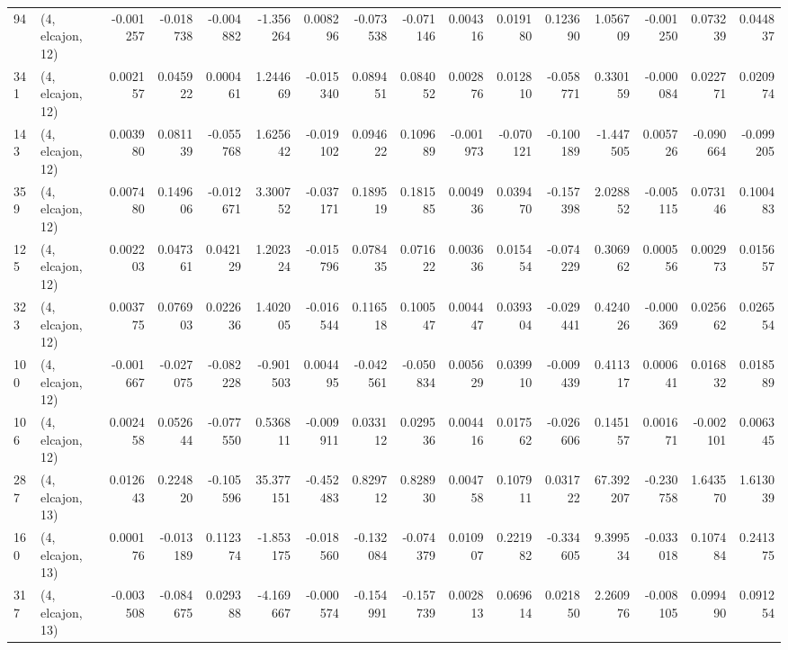 \begin{tabular}{llrrrrrrrrrrrrrr}
94  &  (4, elcajon, 12) &  -0.001257 & -0.018738 & -0.004882 &   -1.356264 &  0.008296 &  -0.073538 & -0.071146 &  0.004316 &  0.019180 &  0.123690 &    1.056709 & -0.001250 &  0.073239 &  0.044837 \\
341 &  (4, elcajon, 12) &   0.002157 &  0.045922 &  0.000461 &    1.244669 & -0.015340 &   0.089451 &  0.084052 &  0.002876 &  0.012810 & -0.058771 &    0.330159 & -0.000084 &  0.022771 &  0.020974 \\
143 &  (4, elcajon, 12) &   0.003980 &  0.081139 & -0.055768 &    1.625642 & -0.019102 &   0.094622 &  0.109689 & -0.001973 & -0.070121 & -0.100189 &   -1.447505 &  0.005726 & -0.090664 & -0.099205 \\
359 &  (4, elcajon, 12) &   0.007480 &  0.149606 & -0.012671 &    3.300752 & -0.037171 &   0.189519 &  0.181585 &  0.004936 &  0.039470 & -0.157398 &    2.028852 & -0.005115 &  0.073146 &  0.100483 \\
125 &  (4, elcajon, 12) &   0.002203 &  0.047361 &  0.042129 &    1.202324 & -0.015796 &   0.078435 &  0.071622 &  0.003636 &  0.015454 & -0.074229 &    0.306962 &  0.000556 &  0.002973 &  0.015657 \\
323 &  (4, elcajon, 12) &   0.003775 &  0.076903 &  0.022636 &    1.402005 & -0.016544 &   0.116518 &  0.100547 &  0.004447 &  0.039304 & -0.029441 &    0.424026 & -0.000369 &  0.025662 &  0.026554 \\
100 &  (4, elcajon, 12) &  -0.001667 & -0.027075 & -0.082228 &   -0.901503 &  0.004495 &  -0.042561 & -0.050834 &  0.005629 &  0.039910 & -0.009439 &    0.411317 &  0.000641 &  0.016832 &  0.018589 \\
106 &  (4, elcajon, 12) &   0.002458 &  0.052644 & -0.077550 &    0.536811 & -0.009911 &   0.033112 &  0.029536 &  0.004416 &  0.017562 & -0.026606 &    0.145157 &  0.001671 & -0.002101 &  0.006345 \\
287 &  (4, elcajon, 13) &   0.012643 &  0.224820 & -0.105596 &   35.377151 & -0.452483 &   0.829712 &  0.828930 &  0.004758 &  0.107911 &  0.031722 &   67.392207 & -0.230758 &  1.643570 &  1.613039 \\
160 &  (4, elcajon, 13) &   0.000176 & -0.013189 &  0.112374 &   -1.853175 & -0.018560 &  -0.132084 & -0.074379 &  0.010907 &  0.221982 & -0.334605 &    9.399534 & -0.033018 &  0.107484 &  0.241375 \\
317 &  (4, elcajon, 13) &  -0.003508 & -0.084675 &  0.029388 &   -4.169667 & -0.000574 &  -0.154991 & -0.157739 &  0.002813 &  0.069614 &  0.021850 &    2.260976 & -0.008105 &  0.099490 &  0.091254 \\

\end{tabular}
